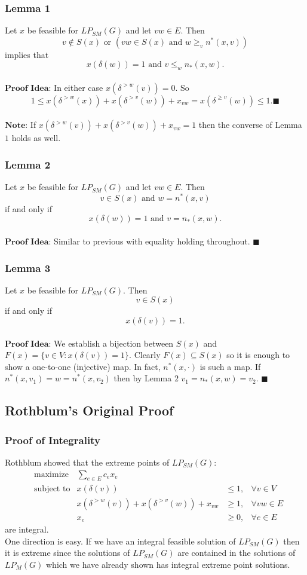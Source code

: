 \documentclass{beamer}
\begin{document}
\begin{frame}
\frametitle{Lemma 1}
Let $x$ be feasible for $LP_{SM}(G)$ and let $vw \in E$. Then $$ v \not\in S(x) \text{ or } (vw \in S(x) \text{ and } w \geq_v n^*(x,v)) $$ implies that $$ x(\delta(w)) = 1 \text{ and } v \leq_w n_*(x,w). $$\\
$\textbf{Proof Idea:}$ In either case $x(\delta^{>w}(v)) = 0$. So $$1 \leq x(\delta^{>w}(x)) + x(\delta^{>v}(w)) + x_{vw} = x(\delta^{\geq v}(w)) \leq 1. \blacksquare$$\\
$\textbf{Note:}$ If $x(\delta^{>w}(v)) + x(\delta^{>v}(w)) + x_{vw} = 1$ then the converse of Lemma $1$ holds as well.
\end{frame}

\begin{frame}
\frametitle{Lemma 2}
Let $x$ be feasible for $LP_{SM}(G)$ and let $vw \in E$. Then $$v \in S(x) \text{ and } w = n^*(x,v)$$ if and only if $$x(\delta(w)) = 1 \text{ and } v = n_*(x,w). $$\\
$\textbf{Proof Idea:}$ Similar to previous with equality holding throughout. $\blacksquare$
\end{frame}

\begin{frame}
\frametitle{Lemma 3}
Let $x$ be feasible for $LP_{SM}(G)$. Then $$ v \in S(x) $$ if and only if $$x(\delta(v)) = 1.$$ \\
$\textbf{Proof Idea:}$ We establish a bijection between $S(x)$ and $F(x) = \{v \in V : x(\delta(v)) = 1\}$. Clearly $F(x) \subseteq S(x)$ so it is enough to show a one-to-one (injective) map. In fact, $n^*(x,\cdot)$ is such a map. If $n^*(x,v_1) = w = n^*(x,v_2)$ then by Lemma $2$ $v_1 = n_*(x,w) = v_2$. $\blacksquare$
\end{frame}

\subsection{Rothblum's Original Proof}
\begin{frame}
\frametitle{Proof of Integrality}
Rothblum showed that the extreme points of  $LP_{SM}(G)$:
\begin{align*}
&\text{maximize} &\sum_{e \in E} c_e x_e \\
&\text{subject to} &x(\delta(v)) &\leq 1, &\forall v \in V\\
& &x(\delta^{>w}(v)) + x(\delta^{>v}(w)) + x_{vw} &\geq 1, &\forall vw \in E\\
& &x_e &\geq 0, &\forall e \in E
\end{align*}
are integral.\\
One direction is easy. If we have an integral feasible solution of $LP_{SM}(G)$ then it is extreme since the solutions of $LP_{SM}(G)$ are contained in the solutions of $LP_M(G)$ which we have already shown has integral extreme point solutions.
\end{frame}
\end{document}
